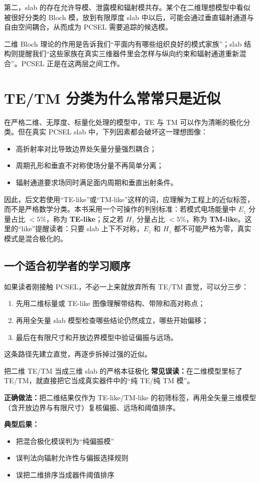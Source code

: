 第二，slab 的存在允许导模、泄露模和辐射模共存。某个在二维理想模型中看似被很好分类的 Bloch 模，放到有限厚度 slab 中以后，可能会通过垂直辐射通道与自由空间耦合，从而成为 PCSEL 需要追踪的候选模。

二维 Bloch 理论的作用是告诉我们“平面内有哪些组织良好的模式家族”；slab 结构则提醒我们“这些家族在真实三维器件里会怎样与纵向约束和辐射通道重新混合”。PCSEL 正是在这两层之间工作。

\section{TE/TM 分类为什么常常只是近似}
在严格二维、无厚度、标量化处理的模型中，TE 与 TM 可以作为清晰的极化分类。但在真实 PCSEL slab 中，下列因素都会破坏这一理想图像：
\begin{itemize}
  \item 高折射率对比导致边界处矢量分量强烈耦合；
  \item 周期孔形和垂直不对称使场分量不再简单分离；
  \item 辐射通道要求场同时满足面内周期和垂直出射条件。
\end{itemize}

因此，后文若使用“TE-like”或“TM-like”这样的词，应理解为工程上的近似标签，而不是严格数学分类。本书采用一个可操作的判别标准：若模式电场能量中 $E_z$ 分量占比 $<5\%$，称为 \textbf{TE-like}；反之若 $H_z$ 分量占比 $<5\%$，称为 \textbf{TM-like}。这里的“like”提醒读者：只要 slab 上下不对称，$E_z$ 和 $H_z$ 都不可能严格为零，真实模式是混合极化的。

\subsection{一个适合初学者的学习顺序}
如果读者刚接触 PCSEL，不必一上来就放弃所有 TE/TM 直觉，可以分三步：
\begin{enumerate}
  \item 先用二维标量或 TE-like 图像理解带结构、带隙和高对称点；
  \item 再用全矢量 slab 模型检查哪些结论仍然成立，哪些开始偏移；
  \item 最后在有限尺寸和开放边界模型中验证偏振与远场。
\end{enumerate}
这条路径先建立直觉，再逐步拆掉过强的近似。

\begin{CommonPitfallBox}{把二维 TE/TM 当成三维 slab 的严格本征极化}
\textbf{常见误读：}在二维模型里标了 TE/TM，就直接把它当成真实器件中的“纯 TE/纯 TM 模”。

\textbf{正确做法：}把二维结果仅作为 TE-like/TM-like 的初筛标签，再用全矢量三维模型（含开放边界与有限尺寸）复核偏振、远场和阈值排序。

\textbf{典型后果：}
\begin{itemize}
  \item 把混合极化模误判为“纯偏振模”
  \item 误判法向辐射允许性与偏振选择规则
  \item 误把二维排序当成器件阈值排序
\end{itemize}
\end{CommonPitfallBox}

